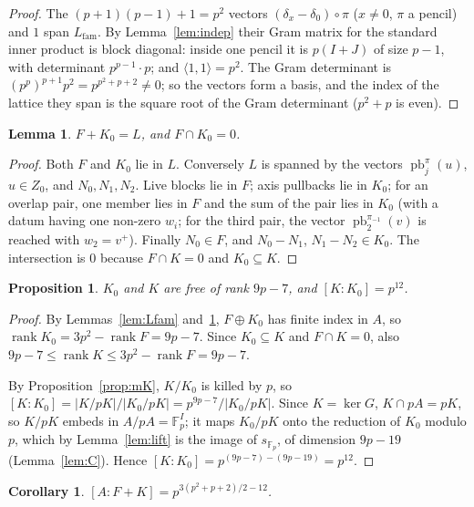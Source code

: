 \documentclass[11pt]{article}
\newtheorem{lemma}[theorem]{Lemma}
\newtheorem{proposition}[theorem]{Proposition}
\newtheorem{corollary}[theorem]{Corollary}
\theoremstyle{definition}
\theoremstyle{remark}
\newcommand{\F}{\mathbb{F}}
\newcommand{\pb}{\operatorname{pb}}
\newcommand{\SAT}{K_0}
\begin{document}
\begin{proof}
The $(p+1)(p-1)+1=p^2$ vectors $(\delta_x-\delta_0)\circ\pi$ ($x\neq0$, $\pi$ a pencil) and $1$ span $L_{\mathrm{fam}}$. By Lemma~\ref{lem:indep} their Gram matrix for the standard inner product is block diagonal: inside one pencil it is $p(I+J)$ of size $p-1$, with determinant $p^{p-1}\cdot p$; and $\langle1,1\rangle=p^2$. The Gram determinant is $(p^p)^{p+1}p^2=p^{p^2+p+2}\neq0$; so the vectors form a basis, and the index of the lattice they span is the square root of the Gram determinant ($p^2+p$ is even).
\end{proof}

\begin{lemma}\label{lem:FSAT}
$F+\SAT=L$, and $F\cap\SAT=0$.
\end{lemma}

\begin{proof}
Both $F$ and $\SAT$ lie in $L$. Conversely $L$ is spanned by the vectors $\pb_j^\pi(u)$, $u\in Z_0$, and $N_0,N_1,N_2$. Live blocks lie in $F$; axis pullbacks lie in $\SAT$; for an overlap pair, one member lies in $F$ and the sum of the pair lies in $\SAT$ (with a datum having one non-zero $w_i$; for the third pair, the vector $\pb_2^{\pi_{-1}}(v)$ is reached with $w_2=v^+$). Finally $N_0\in F$, and $N_0-N_1$, $N_1-N_2\in\SAT$. The intersection is $0$ because $F\cap K=0$ and $\SAT\subseteq K$.
\end{proof}

\begin{proposition}\label{prop:ranks}
$\SAT$ and $K$ are free of rank $9p-7$, and $[K:\SAT]=p^{12}$.
\end{proposition}

\begin{proof}
By Lemmas~\ref{lem:Lfam} and~\ref{lem:FSAT}, $F\oplus\SAT$ has finite index in $A$, so $\operatorname{rank}\SAT=3p^2-\operatorname{rank}F=9p-7$. Since $\SAT\subseteq K$ and $F\cap K=0$, also $9p-7\le\operatorname{rank}K\le3p^2-\operatorname{rank}F=9p-7$.

By Proposition~\ref{prop:mK}, $K/\SAT$ is killed by $p$, so $[K:\SAT]=|K/pK|/|\SAT/pK|=p^{9p-7}/|\SAT/pK|$. Since $K=\ker G$, $K\cap pA=pK$, so $K/pK$ embeds in $A/pA=\F_p^I$; it maps $\SAT/pK$ onto the reduction of $\SAT$ modulo $p$, which by Lemma~\ref{lem:lift} is the image of $s_{\F_p}$, of dimension $9p-19$ (Lemma~\ref{lem:C}). Hence $[K:\SAT]=p^{(9p-7)-(9p-19)}=p^{12}$.
\end{proof}

\begin{corollary}\label{cor:index}
$[A:F+K]=p^{3(p^2+p+2)/2-12}$.
\end{corollary}
\end{document}
